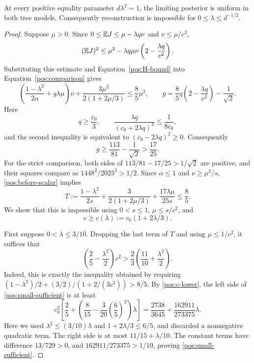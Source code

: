 \begin{proposition}\label{pos:nonreconstruction}
At every positive equality parameter \(d\lambda^2=1\), the limiting
posterior is uniform in both tree models. Consequently reconstruction is
impossible for \(0\le\lambda\le d^{-1/2}\).
\end{proposition}

\begin{proof}
Suppose \(\mu>0\). Since \(0\le\mathbb E J\le\mu-\lambda q\nu\) and
\(\nu\le\mu/c^2\),
\[
 (\mathbb E J)^2\le\mu^2-\lambda q\mu\nu
                  \left(2-\frac{\lambda q}{c^2}\right).
\]
Substituting this estimate and Equation~\eqref{pos:H-bound} into
Equation~\eqref{pos:comparison} gives
\begin{equation}\label{pos:before-scalar}
 \left(\frac{1-\lambda^2}{2\alpha}+g\lambda\mu\right)\nu
  +\frac{3\mu^2}{2(1+2\mu/3)}\le\frac85\mu^2,
 \qquad
 g=\frac85q\left(2-\frac{\lambda q}{c^2}\right)-\frac1{\sqrt2}.
\end{equation}
Here
\[
 q\ge\frac{c_0}{3},\qquad
 \frac{\lambda q}{(c_0+2\lambda q)^2}\le\frac1{8c_0},
\]
and the second inequality is equivalent to
\((c_0-2\lambda q)^2\ge0\). Consequently
\[
 g\ge\frac{113}{81}-\frac1{\sqrt2}>\frac{17}{25}.
\]
For the strict comparison, both sides of
\(113/81-17/25>1/\sqrt2\) are positive, and their squares compare as
\(1448^2/2025^2>1/2\).
Since \(\alpha\le1\) and \(\nu\ge\mu^2/s\),
\eqref{pos:before-scalar} implies
\begin{equation}\label{pos:scalar-necessary}
 T:=\frac{1-\lambda^2}{2s}
       +\frac{3}{2(1+2\mu/3)}
       +\frac{17\lambda\mu}{25s}\le\frac85.
\end{equation}
We show that this is impossible using \(0<s\le1\),
\(\mu\le s/c^2\), and
\begin{equation}\label{pos:c-lower}
 c\ge\underline c(\lambda):=c_0(1+2\lambda/3).
\end{equation}

First suppose \(0<\lambda\le3/10\). Dropping the last term of \(T\)
and using \(\mu\le1/c^2\), it suffices that
\begin{equation}\label{pos:small-sufficient}
 \left(\frac25-\frac{\lambda^2}{2}\right)c^2
 >\frac23\left(\frac{11}{10}+\frac{\lambda^2}{2}\right).
\end{equation}
Indeed, this is exactly the inequality obtained by requiring
\((1-\lambda^2)/2+(3/2)/(1+2/(3c^2))>8/5\).
By \eqref{pos:c-lower}, the left side of \eqref{pos:small-sufficient}
is at least
\[
 c_0^2\left[\frac25+
  \left(\frac8{15}-\frac{3}{20}\left(\frac65\right)^2\right)
       \lambda\right]
 =\frac{2738}{3645}+\frac{162911}{273375}\lambda.
\]
Here we used \(\lambda^2\le(3/10)\lambda\) and
\(1+2\lambda/3\le6/5\), and discarded a nonnegative quadratic term.
The right side is at most \(11/15+\lambda/10\). The constant terms
have difference \(13/729>0\), and
\(162911/273375>1/10\), proving \eqref{pos:small-sufficient}.


\end{proof}
